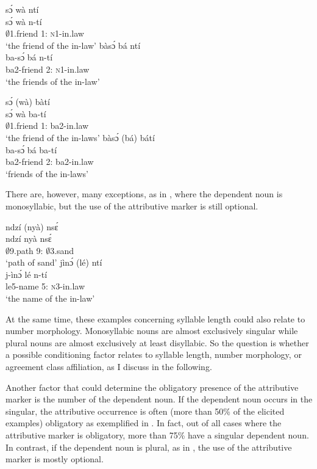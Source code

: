\ea\label{PHO}
\ea \label{PHO1}
  \glll    sɔ́ wà ntí \\
  sɔ́ wà n-tí \\
               $\emptyset$1.friend 1:{\ATT} \textsc{n}1-in.law \\
    \trans `the friend of the in-law'
\ex\label{PHO2}
 \glll    bàsɔ́ bá ntí \\
      ba-sɔ́ bá n-tí \\
               ba2-friend 2:{\ATT} \textsc{n}1-in.law \\
    \trans `the friends of the in-law'
\z
\z


\ea\label{pho}
\ea \label{pho1}
  \glll     sɔ́ (wà) bàtí \\
  sɔ́ wà ba-tí \\
               $\emptyset$1.friend 1:{\ATT} ba2-in.law  \\
    \trans `the friend of the in-laws'
\ex\label{pho2}
 \glll    bàsɔ́ (bá) bátí  \\
 ba-sɔ́ bá ba-tí  \\
               ba2-friend 2:{\ATT} ba2-in.law \\
    \trans `friends of the in-laws'
\z
\z


\noindent There are, however, many exceptions, as in , where the dependent noun is monosyllabic, but the use of the attributive marker is still optional.

\ea\label{syll}
\ea \label{syll1}
  \glll     ndzí (nyà) nsɛ́ \\
  ndzí nyà nsɛ́ \\
              $\emptyset$9.path 9:{\ATT} $\emptyset$3.sand   \\
    \trans `path of sand'
\ex\label{syll2}
 \glll   jìnɔ́ (lé) ntí   \\
 j-ìnɔ́ lé n-tí   \\
              le5-name 5:{\ATT} \textsc{n}3-in.law \\
    \trans `the name of the in-law'
\z
\z

At the same time, these examples concerning syllable length could also relate to number morphology. Monosyllabic nouns are almost exclusively singular while plural nouns are almost exclusively at least disyllabic. So the question is whether a possible conditioning factor relates to syllable length, number morphology, or agreement class affiliation, as I discuss in the following.

Another factor that could determine the obligatory presence of the attributive marker is the number of the dependent noun. If the dependent noun occurs in the singular, the attributive occurrence is often (more than 50\% of the elicited examples) obligatory as exemplified in . In fact, out of all cases where the attributive marker is obligatory, more than 75\% have a singular dependent noun. In contrast, if the dependent noun is plural, as in , the use of the attributive marker is mostly optional.


